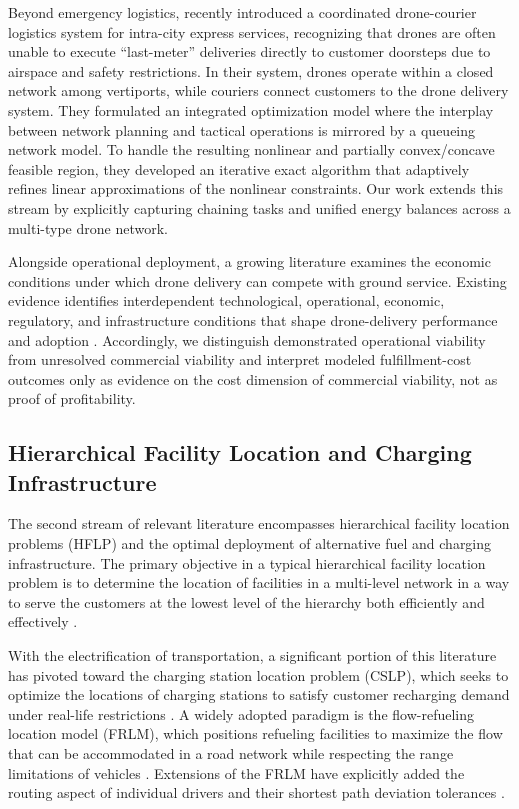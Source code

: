 \documentclass[final,3p,authoryear]{elsarticle}
\begin{document}
Beyond emergency logistics, \citet{chenCoordinatedDroneCourier2025} recently introduced a coordinated drone-courier logistics system for intra-city express services, recognizing that drones are often unable to execute ``last-meter'' deliveries directly to customer doorsteps due to airspace and safety restrictions.
In their system, drones operate within a closed network among vertiports, while couriers connect customers to the drone delivery system.
They formulated an integrated optimization model where the interplay between network planning and tactical operations is mirrored by a queueing network model.
To handle the resulting nonlinear and partially convex/concave feasible region, they developed an iterative exact algorithm that adaptively refines linear approximations of the nonlinear constraints.
Our work extends this stream by explicitly capturing chaining tasks and unified energy balances across a multi-type drone network.

\color{blue}
Alongside operational deployment, a growing literature examines the economic conditions under which drone delivery can compete with ground service.
Existing evidence identifies interdependent technological, operational, economic, regulatory, and infrastructure conditions that shape drone-delivery performance and adoption \citep{DroneEconomicViabilityReview2025}.
Accordingly, we distinguish demonstrated operational viability from unresolved commercial viability and interpret modeled fulfillment-cost outcomes only as evidence on the cost dimension of commercial viability, not as proof of profitability.
\color{black}

\subsection{Hierarchical Facility Location and Charging Infrastructure}

The second stream of relevant literature encompasses hierarchical facility location problems (HFLP) and the optimal deployment of alternative fuel and charging infrastructure.
The primary objective in a typical hierarchical facility location problem is to determine the location of facilities in a multi-level network in a way to serve the customers at the lowest level of the hierarchy both efficiently and effectively \citep{farahaniHierarchicalFacilityLocation2014}.

With the electrification of transportation, a significant portion of this literature has pivoted toward the charging station location problem (CSLP), which seeks to optimize the locations of charging stations to satisfy customer recharging demand under real-life restrictions \citep{kchaou-boujelbenChargingStation2021TRC}.
A widely adopted paradigm is the flow-refueling location model (FRLM), which positions refueling facilities to maximize the flow that can be accommodated in a road network while respecting the range limitations of vehicles \citep{mirhassaniFlexibleReformulationRefueling2013}.
Extensions of the FRLM have explicitly added the routing aspect of individual drivers and their shortest path deviation tolerances \citep{yildizBranchPriceApproach2016}.
\end{document}
